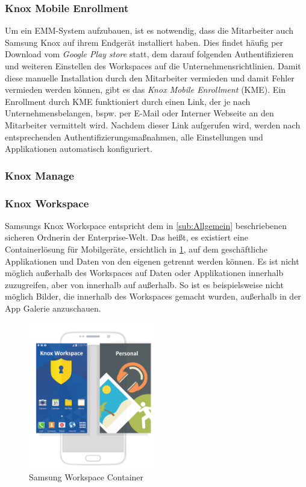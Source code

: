 \subsubsection{Knox Mobile Enrollment}
Um ein EMM-System aufzubauen, ist es notwendig, dass die Mitarbeiter auch Samsung Knox auf ihrem Endgerät installiert haben. Dies findet häufig per Download vom \textit{Google Play store} statt, dem darauf folgenden Authentifizieren und weiteren Einstellen des Workspaces auf die Unternehmensrichtlinien. 
Damit diese manuelle Installation durch den Mitarbeiter vermieden und damit Fehler vermieden werden können, gibt es das \textit{Knox Mobile Enrollment} (KME). Ein Enrollment durch KME funktioniert durch einen Link, der je nach Unternehmensbelangen, bspw. per E-Mail oder Interner Webseite an den Mitarbeiter vermittelt wird. Nachdem dieser Link aufgerufen wird, werden nach entsprechenden Authentifizierungsmaßnahmen, alle Einstellungen und Applikationen automatisch konfiguriert.

\subsubsection{Knox Manage}

\subsubsection{Knox Workspace}
Samsungs Knox Workspace entspricht dem in \cref{sub:Allgemein} beschriebenen \flqq sicheren Ordner\frqq in der Enterprise-Welt. Das heißt, es existiert eine Containerlösung für Mobilgeräte, ersichtlich in \cref{fig:SamKno2}, auf dem geschäftliche Applikationen und Daten von den eigenen getrennt werden können. Es ist nicht möglich außerhalb des Workspaces auf Daten oder Applikationen innerhalb zuzugreifen, aber von innerhalb auf außerhalb. So ist es beispielsweise nicht möglich Bilder, die innerhalb des Workspaces gemacht wurden, außerhalb in der App Galerie anzuschauen.
\begin{figure}[hbt]
\centering
\includegraphics[width=0.5\textwidth]{Bilder/sk_2}
\caption{Samsung Workspace Container}\label{fig:SamKno2}
\end{figure}

